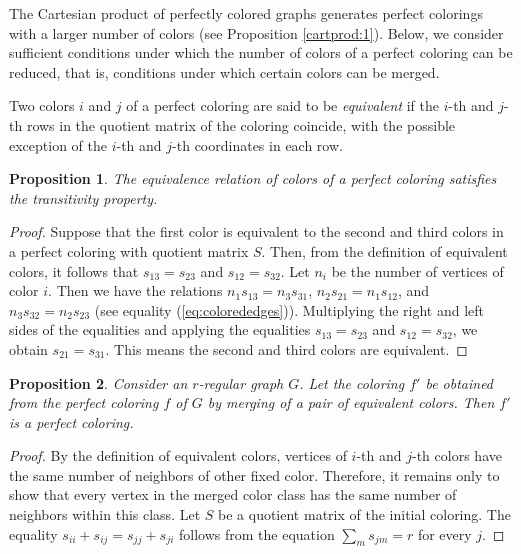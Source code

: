 \documentclass[11pt]{article}
\newtheorem{claim}{Proposition}[section]
\theoremstyle{definition}
\begin{document}
The Cartesian product of perfectly colored graphs generates
 perfect colorings with a larger number of colors (see Proposition \ref{cartprod:1}). 
 Below, we consider sufficient conditions under which the number of colors of a perfect coloring can be reduced, that is, conditions under which certain colors can be merged.



Two colors $i$ and $j$ of a perfect coloring are said to be
{\sl equivalent}  if the $i$-th and $j$-th rows in the quotient matrix
of the coloring coincide, with the possible exception of the $i$-th and $j$-th
coordinates in each row.

\begin{claim} The equivalence relation of colors of a perfect coloring satisfies the
transitivity property. \end{claim}
\begin{proof}
Suppose
that the first color is equivalent to the second and third colors in a perfect
coloring with quotient matrix $S$. Then, from the definition
of equivalent colors, it follows that $s_{13}=s_{23}$ and
$s_{12}=s_{32}$. Let $n_i$
be the number of vertices of color $i$. Then we have the relations $n_1 s_{13}=n_3s_{31}$,
$n_2s_{21}=n_1 s_{12}$, and $n_3 s_{32}=n_2s_{23}$  (see equality
(\ref{eq:colorededges})). Multiplying the right and left sides of the equalities and applying the equalities $s_{13}=s_{23}$ and
$s_{12}=s_{32}$, we obtain $s_{21}= s_{31}$. This means the second and third
colors are equivalent.
\end{proof}

\begin{claim}\label{cor:scleiv}
Consider an $r$-regular graph $G$.
Let the coloring $f'$ be obtained from the perfect coloring $f$ of $G$
by merging of a pair of equivalent colors. Then $f'$ is a perfect
coloring. \end{claim}
\begin{proof}
By the definition of equivalent colors, vertices of $i$-th and $j$-th colors have the same number of neighbors of other fixed color. 
Therefore, it remains only to show that every vertex in the merged color class has the same number of neighbors within this class.
 Let $S$ be a quotient matrix of the initial coloring. The equality  $s_{ii}+s_{ij}=s_{jj}+s_{ji}$ follows from the equation $\sum\limits_{m}s_{jm}=r$ for every $j$.   
\end{proof}
\end{document}
